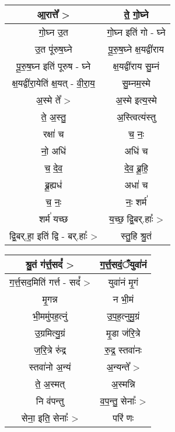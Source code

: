 {\centering
\begin{longtable}{|c|c|}
\hline
आ॒रात्ते᳚ >                      & ते॒ गो॒घ्ने\\
\hline
गो॒घ्न उ॒त                      & गो॒घ्न इति॑ गो - घ्ने\\
\hline
उ॒त पू॑रुष॒घ्ने                     & पू॒रु॒ष॒घ्ने क्ष॒यद्वी॑राय\\
\hline
पू॒रु॒ष॒घ्न इति॑ पूरुष - घ्ने           & क्ष॒यद्वी॑राय सु॒म्नं\\
\hline
क्ष॒यद्वी॑रा॒येति॑ क्ष॒यत् - वी॒रा॒य॒     & सु॒म्नम॒स्मे\\
\hline
अ॒स्मे ते᳚ >                      & अ॒स्मे इत्य॒स्मे\\
\hline
ते॒ अ॒स्तु॒                        & अ॒स्त्वित्य॑स्तु\\
\hline
रक्षा॑ च                       & च॒ नः॒\\
\hline
नो॒ अधि॑                       & अधि॑ च\\
\hline
च॒ दे॒व॒                         & दे॒व॒ ब्रू॒हि॒\\
\hline
ब्रू॒ह्यध॑                        & अधा॑ च\\
\hline
च॒ नः॒                         & नः॒ शर्म॑\\
\hline
शर्म॑ यच्छ                      & य॒च्छ॒ द्वि॒बर्.हाः᳚ >\\
\hline
द्वि॒बर्.हा॒ इति॑ द्वि - बर्.हाः᳚ >  & स्तु॒हि श्रु॒तं\\
\hline
\end{longtable}
}
{\centering
\begin{longtable}{|c|c|}
\hline
श्रु॒तं ग॑र्त्त॒सदं᳚ >                 & ग॒र्त्त॒सदं॒ँयुवा॑नं\\
\hline
ग॒र्त्त॒सद॒मिति॑ गर्त्त - सदं᳚ >       & युवा॑नं मृ॒गं\\
\hline
मृ॒गन्न                         & न भी॒मं\\
\hline
भी॒ममु॑पह॒त्नुं                     & उ॒प॒ह॒त्नुमु॒ग्रं\\
\hline
उ॒ग्रमित्यु॒ग्रं                    & मृ॒डा ज॑रि॒त्रे\\
\hline
ज॒रि॒त्रे रु॑द्र                    & रु॒द्र॒ स्तवा॑नः\\
\hline
स्तवा॑नो अ॒न्यं                   & अ॒न्यन्ते᳚ >\\
\hline
ते॒ अ॒स्मत्                       & अ॒स्मन्नि\\
\hline
नि व॑पन्तु                      & व॒प॒न्तु॒ सेनाः᳚ >\\
\hline
सेना॒ इति॒ सेनाः᳚ >               & परि॑ णः\\
\hline
\end{longtable}
}

